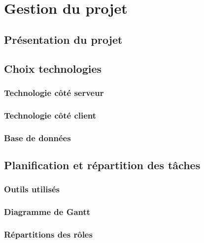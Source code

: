 \chapter{Gestion du projet}

\section{Présentation du projet}



\section{Choix technologies}

\subsection{Technologie côté serveur}


\subsection{Technologie côté client}

\subsection{Base de données}


\section{Planification et répartition des tâches}

\subsection{Outils utilisés}


\subsection{Diagramme de Gantt}


\subsection{Répartitions des rôles}